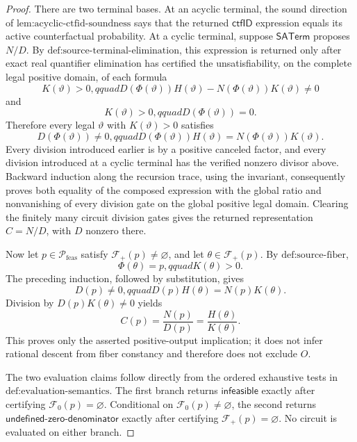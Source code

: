 \documentclass{article}
\begin{document}
\begin{proof}
There are two terminal bases.  At an acyclic terminal, the sound direction of \(\text{lem:acyclic-ctfid-soundness}\) says that the returned \(\mathsf{ctfID}\) expression equals its active counterfactual probability.  At a cyclic terminal, suppose \(\mathsf{SATerm}\) proposes \(N/D\).  By \(\text{def:source-terminal-elimination}\), this expression is returned only after exact real quantifier elimination has certified the unsatisfiability, on the complete legal positive domain, of each formula
\[
 K(\vartheta)>0,qquad
 D(\Phi(\vartheta))H(\vartheta)-N(\Phi(\vartheta))K(\vartheta)\ne0
\]
and
\[
 K(\vartheta)>0,qquad D(\Phi(\vartheta))=0.
\]
Therefore every legal \(\vartheta\) with \(K(\vartheta)>0\) satisfies
\[
 D(\Phi(\vartheta))\ne0,qquad
 D(\Phi(\vartheta))H(\vartheta)
 =N(\Phi(\vartheta))K(\vartheta).
\]
Every division introduced earlier is by a positive canceled factor, and every division introduced at a cyclic terminal has the verified nonzero divisor above.  Backward induction along the recursion trace, using the invariant, consequently proves both equality of the composed expression with the global ratio and nonvanishing of every division gate on the global positive legal domain.  Clearing the finitely many circuit division gates gives the returned representation \(C=N/D\), with \(D\) nonzero there.

Now let \(p\in\mathcal P_{\mathrm{feas}}\) satisfy \(\mathcal F_+(p)\ne\varnothing\), and let \(\theta\in\mathcal F_+(p)\).  By \(\text{def:source-fiber}\),
\[
 \Phi(\theta)=p,qquad K(\theta)>0.
\]
The preceding induction, followed by substitution, gives
\[
 D(p)\ne0,qquad
 D(p)H(\theta)=N(p)K(\theta).
\]
Division by \(D(p)K(\theta)\ne0\) yields
\[
 C(p)=\frac{N(p)}{D(p)}=\frac{H(\theta)}{K(\theta)}.
\]
This proves only the asserted positive-output implication; it does not infer rational descent from fiber constancy and therefore does not exclude \(O\).

The two evaluation claims follow directly from the ordered exhaustive tests in \(\text{def:evaluation-semantics}\).  The first branch returns \(\mathsf{infeasible}\) exactly after certifying \(\mathcal F_0(p)=\varnothing\).  Conditional on \(\mathcal F_0(p)\ne\varnothing\), the second returns \(\mathsf{undefined\mbox{-}zero\mbox{-}denominator}\) exactly after certifying \(\mathcal F_+(p)=\varnothing\).  No circuit is evaluated on either branch.


\end{proof}
\end{document}
